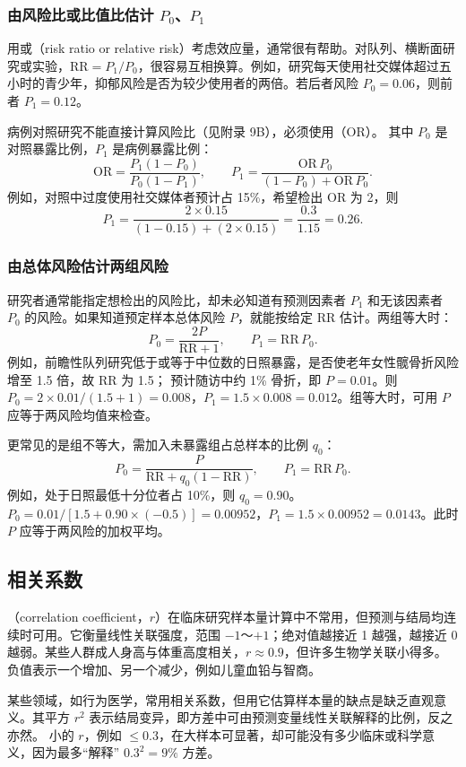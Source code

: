 \subsubsection{由风险比或比值比估计 \texorpdfstring{$P_0$}{P0}、\texorpdfstring{$P_1$}{P1}}
用或（risk ratio or relative risk）考虑效应量，通常很有帮助。对队列、横断面研究或实验，$\mathrm{RR}=P_1/P_0$，很容易互相换算。例如，研究每天使用社交媒体超过五小时的青少年，抑郁风险是否为较少使用者的两倍。若后者风险 $P_0=0.06$，则前者 $P_1=0.12$。

病例对照研究不能直接计算风险比（见附录 9B），必须使用（OR）。
其中 $P_0$ 是对照暴露比例，$P_1$ 是病例暴露比例：
\[
\mathrm{OR}=\frac{P_1(1-P_0)}{P_0(1-P_1)},\qquad
P_1=\frac{\mathrm{OR}\,P_0}{(1-P_0)+\mathrm{OR}\,P_0}.
\]
例如，对照中过度使用社交媒体者预计占 15\%，希望检出 OR 为 2，则
\[
P_1=\frac{2\times0.15}{(1-0.15)+(2\times0.15)}=\frac{0.3}{1.15}=0.26.
\]
\subsubsection{由总体风险估计两组风险}
研究者通常能指定想检出的风险比，却未必知道有预测因素者 $P_1$ 和无该因素者 $P_0$ 的风险。如果知道预定样本总体风险 $P$，就能按给定 RR 估计。两组等大时：
\[
P_0=\frac{2P}{\mathrm{RR}+1},\qquad P_1=\mathrm{RR}\,P_0.
\]
例如，前瞻性队列研究低于或等于中位数的日照暴露，是否使老年女性髋骨折风险增至 1.5 倍，故 RR 为 1.5；
预计随访中约 1\% 骨折，即 $P=0.01$。则 $P_0=2\times0.01/(1.5+1)=0.008$，$P_1=1.5\times0.008=0.012$。组等大时，可用 $P$ 应等于两风险均值来检查。

更常见的是组不等大，需加入未暴露组占总样本的比例 $q_0$：
\[
P_0=\frac{P}{\mathrm{RR}+q_0(1-\mathrm{RR})},\qquad P_1=\mathrm{RR}\,P_0.
\]
例如，处于日照最低十分位者占 10\%，则 $q_0=0.90$。$P_0=0.01/[1.5+0.90\times(-0.5)]=0.00952$，$P_1=1.5\times0.00952=0.0143$。此时 $P$ 应等于两风险的加权平均。

\subsection{相关系数}
（correlation coefficient，$r$）在临床研究样本量计算中不常用，但预测与结局均连续时可用。它衡量线性关联强度，范围 $-1$～$+1$；绝对值越接近 1 越强，越接近 0 越弱。某些人群成人身高与体重高度相关，$r\approx0.9$，但许多生物学关联小得多。负值表示一个增加、另一个减少，例如儿童血铅与智商。

某些领域，如行为医学，常用相关系数，但用它估算样本量的缺点是缺乏直观意义。其平方 $r^2$ 表示结局变异，即方差中可由预测变量线性关联解释的比例，反之亦然。
小的 $r$，例如 $\leq0.3$，在大样本可显著，却可能没有多少临床或科学意义，因为最多“解释” $0.3^2=9\%$ 方差。

